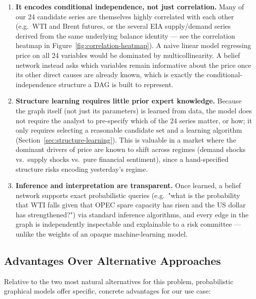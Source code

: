 \begin{enumerate}
  \item \textbf{It encodes conditional independence, not just correlation.}
    Many of our 24 candidate series are themselves highly correlated with
    each other (e.g.\ WTI and Brent futures, or the several EIA supply/demand
    series derived from the same underlying balance identity — see the
    correlation heatmap in Figure~\ref{fig:correlation-heatmap}). A naive
    linear model regressing price on all 24 variables would be dominated by
    multicollinearity. A belief network instead asks which variables
    remain informative about the price once its other direct causes are
    already known, which is exactly the conditional-independence structure a
    DAG is built to represent.
  \item \textbf{Structure learning requires little prior expert knowledge.}
    Because the graph itself (not just its parameters) is learned from data,
    the model does not require the analyst to pre-specify which of the 24
    series matter, or how; it only requires selecting a reasonable candidate
    set and a learning algorithm (Section~\ref{sec:structure-learning}). This
    is valuable in a market where the dominant drivers of price are known to
    shift across regimes (demand shocks vs.\ supply shocks vs.\ pure
    financial sentiment), since a hand-specified structure risks encoding
    yesterday's regime.
  \item \textbf{Inference and interpretation are transparent.} Once learned,
    a belief network supports exact probabilistic queries (e.g.\ "what is the
    probability that WTI falls given that OPEC spare capacity has risen and
    the US dollar has strengthened?") via standard inference algorithms, and
    every edge in the graph is independently inspectable and explainable to a
    risk committee — unlike the weights of an opaque machine-learning model.
\end{enumerate}

\subsection{Advantages Over Alternative Approaches}

Relative to the two most natural alternatives for this problem, probabilistic
graphical models offer specific, concrete advantages for our use case:

